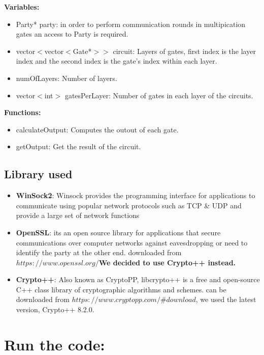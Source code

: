 \documentclass[12pt]{article}
\begin{document}
\textbf{Variables:}
\begin{itemize}
\item Party* party: in order to perform communication rounds in multipication gates an access to Party is required.
\item vector$<$vector$<$Gate*$>>$ circuit: Layers of gates, first index is the layer index and the second index is the gate's index within each layer.
\item numOfLayers: Number of layers.
\item vector$<$int$>$ gatesPerLayer: Number of gates in each layer of the circuits.

\end{itemize}
\textbf{Functions:}
\begin{itemize}
	\item calculateOutput: Computes the outout of each gate.
	\item getOutput: Get the result of the circuit.
\end{itemize}
\subsection{Library used}
\begin{itemize}
	\item \textbf{WinSock2}: Winsock provides the programming interface for applications to communicate using popular network protocols such as TCP \& UDP and provide a large set of network functions 
	\item \textbf{OpenSSL}: its an open source library for applications that secure communications over computer networks against eavesdropping or need to identify the party at the other end. downloaded from $https://www.openssl.org/$\break \textbf{We decided to use Crypto++ instead.}
	
	\item\textbf{Crypto++}: Also known as CryptoPP, libcrypto++ is a free and open-source C++ class library of cryptographic algorithms and schemes. can be downloaded from $https://www.cryptopp.com/\#download$, we used the latest version, Crypto++ 8.2.0.
\end{itemize}
\pagebreak
\section{Run the code:}
\end{document}
